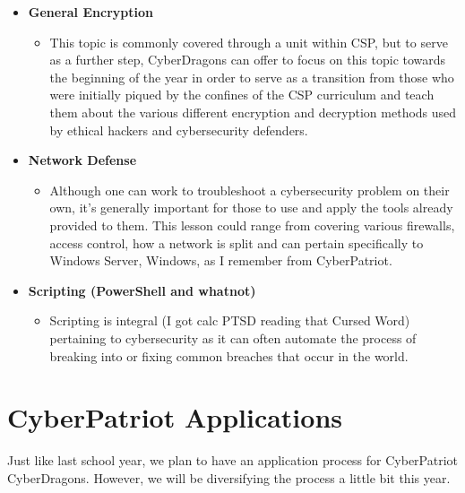 \documentclass[
  letterpaper,
  DIV=11,
  numbers=noendperiod]{scrartcl}
\providecommand{\tightlist}{%
  \setlength{\itemsep}{0pt}\setlength{\parskip}{0pt}}\usepackage{longtable,booktabs,array}
\begin{document}
\begin{itemize}
\tightlist
\item
  \textbf{General Encryption}

  \begin{itemize}
  \tightlist
  \item
    This topic is commonly covered through a unit within CSP, but to
    serve as a further step, CyberDragons can offer to focus on this
    topic towards the beginning of the year in order to serve as a
    transition from those who were initially piqued by the confines of
    the CSP curriculum and teach them about the various different
    encryption and decryption methods used by ethical hackers and
    cybersecurity defenders.
  \end{itemize}
\item
  \textbf{Network Defense}

  \begin{itemize}
  \tightlist
  \item
    Although one can work to troubleshoot a cybersecurity problem on
    their own, it's generally important for those to use and apply the
    tools already provided to them. This lesson could range from
    covering various firewalls, access control, how a network is split
    and can pertain specifically to Windows Server, Windows, as I
    remember from CyberPatriot.
  \end{itemize}
\item
  \textbf{Scripting (PowerShell and whatnot)}

  \begin{itemize}
  \tightlist
  \item
    Scripting is integral (I got calc PTSD reading that Cursed Word)
    pertaining to cybersecurity as it can often automate the process of
    breaking into or fixing common breaches that occur in the world.
  \end{itemize}
\end{itemize}

\newpage{}

\hypertarget{cyberpatriot-applications}{%
\section{CyberPatriot Applications}\label{cyberpatriot-applications}}

Just like last school year, we plan to have an application process for
CyberPatriot CyberDragons. However, we will be diversifying the process
a little bit this year.
\end{document}
